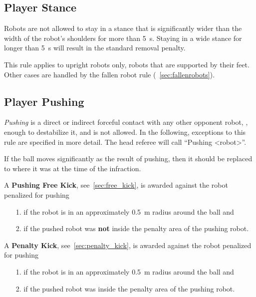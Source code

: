 \subsection{Player Stance}
\label{sec:player_stance}

Robots are not allowed to stay in a stance that is significantly wider than the width of the robot's shoulders for more than \qty{5}{\second}.
Staying in a wide stance for longer than \qty{5}{\second} will result in the standard removal penalty.

This rule applies to upright robots only, \ie robots that are supported by their feet.
Other cases are handled by the fallen robot rule (\cf~\cref{sec:fallenrobots}).

\subsection{Player Pushing}
\label{sec:player_pushing}

\emph{Pushing} is a direct or indirect forceful contact with any other opponent robot, \ie, enough to destabilize it, and is not allowed.
In the following, exceptions to this rule are specified in more detail.
The head referee will call ``Pushing \textless robot\textgreater''.

If the ball moves significantly as the result of pushing, then it should be replaced to where it was at the time of the infraction.

A \textbf{Pushing Free Kick}, see~\cref{sec:free_kick}, is awarded against the robot penalized for pushing
\begin{itemize}
  \item[1.] if the robot is in an approximately \qty{0.5}{\metre} radius around the ball and
  \item[2.] if the pushed robot was \textbf{not} inside the penalty area of the pushing robot.
\end{itemize}

A \textbf{Penalty Kick}, see~\cref{sec:penalty_kick}, is awarded against the robot penalized for pushing
\begin{itemize}
  \item[1.] if the robot is in an approximately \qty{0.5}{\metre} radius around the ball and
  \item[2.] if the pushed robot was inside the penalty area of the pushing robot.
\end{itemize}

